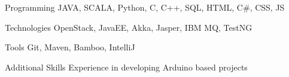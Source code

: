 

\begin{cvskills}

  \cvskill
    {Programming} %
    {JAVA, SCALA, Python, C, C++, SQL, HTML, C\#, CSS, JS} %

  \cvskill
    {Technologies} %
    {OpenStack, JavaEE, Akka, Jasper, IBM MQ, TestNG} %

  \cvskill
    {Tools} %
    {Git, Maven, Bamboo, IntelliJ} %

  \cvskill
    {Additional Skills} %
    {Experience in developing Arduino based projects } %

\end{cvskills}
